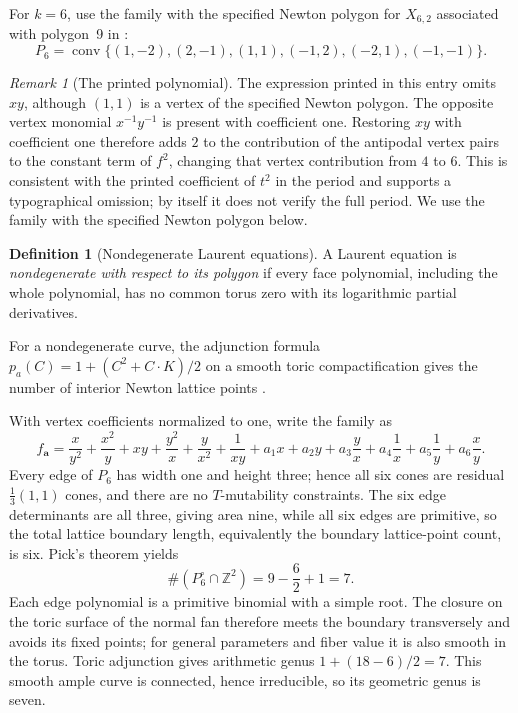 \documentclass[11pt]{article}
\theoremstyle{plain}
\theoremstyle{definition}
\newtheorem{definition}[theorem]{Definition}
\theoremstyle{remark}
\newtheorem{remark}[theorem]{Remark}
\newcommand{\Z}{\mathbb Z}
\newcommand{\1}{\mathbf 1}
\begin{document}
For $k=6$, use the family with the specified Newton polygon for $X_{6,2}$ associated with polygon~9 in \cite[Section 7.7, entry 26]{OP}:
\begin{equation}\label{eq:op-six-polygon}
P_6=\operatorname{conv}\{(1,-2),(2,-1),(1,1),(-1,2),(-2,1),(-1,-1)\}.
\end{equation}

\begin{remark}[The printed polynomial]\label{rem:printed-polynomial}
The expression printed in this entry omits $xy$, although $(1,1)$ is a vertex of the specified Newton polygon.  The opposite vertex monomial $x^{-1}y^{-1}$ is present with coefficient one.  Restoring $xy$ with coefficient one therefore adds $2$ to the contribution of the antipodal vertex pairs to the constant term of $f^2$, changing that vertex contribution from $4$ to $6$.  This is consistent with the printed coefficient of $t^2$ in the period and supports a typographical omission; by itself it does not verify the full period.  We use the family with the specified Newton polygon below.
\end{remark}

\begin{definition}[Nondegenerate Laurent equations]
A Laurent equation is \emph{nondegenerate with respect to its polygon} if every face polynomial, including the whole polynomial, has no common torus zero with its logarithmic partial derivatives.
\end{definition}

For a nondegenerate curve, the adjunction formula $p_a(C)=1+(C^2+C\cdot K)/2$ on a smooth toric compactification gives the number of interior Newton lattice points \cite[Section 1, Theorem 1]{KhovanskiiGenus}.

With vertex coefficients normalized to one, write the family as
\[
f_{\boldsymbol a}=\frac{x}{y^2}+\frac{x^2}{y}+xy+\frac{y^2}{x}
+\frac y{x^2}+\frac1{xy}
+a_1x+a_2y+a_3\frac yx+a_4\frac1x+a_5\frac1y+a_6\frac xy.
\]
Every edge of $P_6$ has width one and height three; hence all six cones are residual $\frac13(1,1)$ cones, and there are no $T$-mutability constraints.  The six edge determinants are all three, giving area nine, while all six edges are primitive, so the total lattice boundary length, equivalently the boundary lattice-point count, is six.  Pick's theorem yields
\[
\#(P_6^\circ\cap\Z^2)=9-\frac62+1=7.
\]
Each edge polynomial is a primitive binomial with a simple root.  The closure on the toric surface of the normal fan therefore meets the boundary transversely and avoids its fixed points; for general parameters and fiber value it is also smooth in the torus.  Toric adjunction gives arithmetic genus $1+(18-6)/2=7$.  This smooth ample curve is connected, hence irreducible, so its geometric genus is seven.
\end{document}
